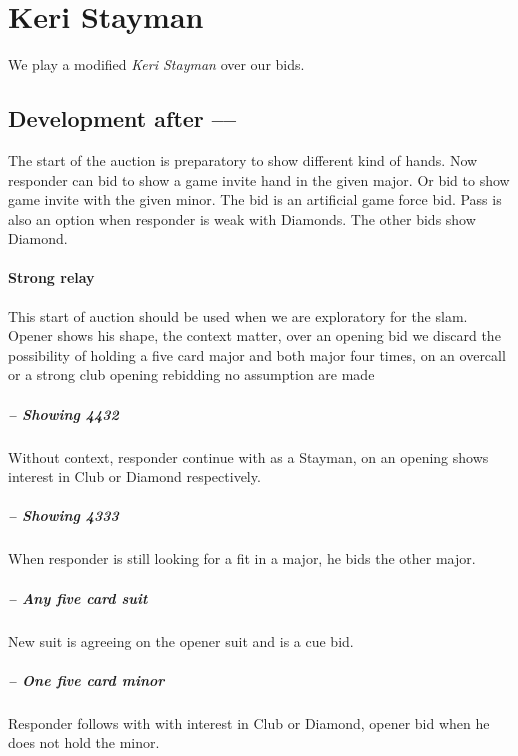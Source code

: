 \section{Keri Stayman}
We play a modified \emph{Keri Stayman} over our \bid{1\NT} bids.
\subsection{Development after \bid{1\NT}–\bid{2\CS}–\bid{2\DS}}
The start of the auction is preparatory to show different kind of hands. Now responder can bid \bid{2\HS/\SpS} to show a game invite hand in the given major. Or bid \bid{3\CS/\DS} to show game invite with the given minor. The bid \bid{2\NT} is an artificial game force bid. Pass is also an option when responder is weak with Diamonds. The other bids show Diamond.
\paragraph{\bid{2\NT} Strong relay}
This start of auction should be used when we are exploratory for the slam. Opener shows his shape, the \bid{1\NT} context matter, over an opening bid we discard the possibility of holding a five card major and both major four times, on an overcall or a strong club opening rebidding \bid{1\NT} no assumption are made
\subparagraph{\bid{3\CS} – Showing 4432} Without context, responder continue with \bid{3\DS} as a Stayman, on an \bid{1\NT} opening \bid{3\HS/\SpS} shows interest in Club or Diamond respectively.
\subparagraph{\bid{3\DS} – Showing 4333} When responder is still looking for a fit in a major, he bids the other major.
\subparagraph{\bid{3\HS/\SpS} – Any five card suit} New suit is agreeing on the opener suit and is a cue bid.
\subparagraph{\bid{3\NT} – One five card minor} Responder follows with \bid{4\CS/\DS} with interest in Club or Diamond, opener bid \bid{4\NT} when he does not hold the minor.
